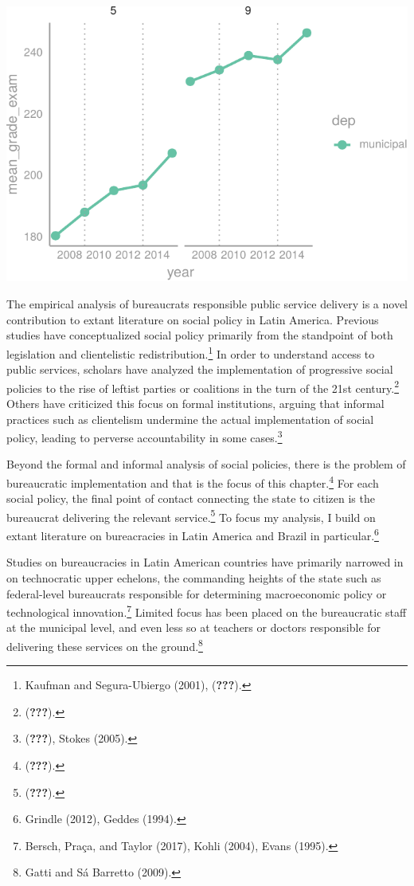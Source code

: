 \documentclass[12pt,]{article}
\let\rmarkdownfootnote\footnote%
\def\footnote{\protect\rmarkdownfootnote}
\begin{document}
\begin{center}\includegraphics{dissertation_files/figure-latex/unnamed-chunk-17-1} \end{center}

The empirical analysis of bureaucrats responsible public service
delivery is a novel contribution to extant literature on social policy
in Latin America. Previous studies have conceptualized social policy
primarily from the standpoint of both legislation and clientelistic
redistribution.\footnote{Kaufman and Segura-Ubiergo (2001),
  ({\textbf{???}}).} In order to understand access to public services,
scholars have analyzed the implementation of progressive social policies
to the rise of leftist parties or coalitions in the turn of the 21st
century.\footnote{({\textbf{???}}).} Others have criticized this focus
on formal institutions, arguing that informal practices such as
clientelism undermine the actual implementation of social policy,
leading to perverse accountability in some cases.\footnote{({\textbf{???}}),
  Stokes (2005).}

Beyond the formal and informal analysis of social policies, there is the
problem of bureaucratic implementation and that is the focus of this
chapter.\footnote{({\textbf{???}}).} For each social policy, the final
point of contact connecting the state to citizen is the bureaucrat
delivering the relevant service.\footnote{({\textbf{???}}).} To focus my
analysis, I build on extant literature on bureacracies in Latin America
and Brazil in particular.\footnote{Grindle (2012), Geddes (1994).}

Studies on bureaucracies in Latin American countries have primarily
narrowed in on technocratic upper echelons, the commanding heights of
the state such as federal-level bureaucrats responsible for determining
macroeconomic policy or technological innovation.\footnote{Bersch,
  Praça, and Taylor (2017), Kohli (2004), Evans (1995).} Limited focus
has been placed on the bureaucratic staff at the municipal level, and
even less so at teachers or doctors responsible for delivering these
services on the ground.\footnote{Gatti and Sá Barretto (2009).}
\end{document}
